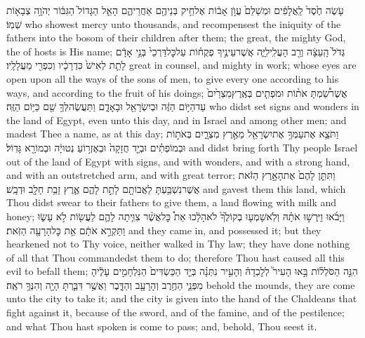 {עֹ֤שֶׂה חֶ֙סֶד֙ לַֽאֲלָפִ֔ים וּמְשַׁלֵּם֙ עֲוֺ֣ן אָב֔וֹת אֶל\maqqaf חֵ֥יק בְּנֵיהֶ֖ם אַחֲרֵיהֶ֑ם הָאֵ֤ל הַגָּדוֹל֙ הַגִּבּ֔וֹר יְהֹוָ֥ה צְבָא֖וֹת שְׁמֽוֹ׃}
{who showest mercy unto thousands, and recompensest the iniquity of the fathers into the bosom of their children after them; the great, the mighty God, the \lord\space of hosts is His name;}
{גְּדֹל֙ הָֽעֵצָ֔ה וְרַ֖ב הָעֲלִֽילִיָּ֑ה אֲשֶׁר\maqqaf עֵינֶ֣יךָ פְקֻח֗וֹת עַל\maqqaf כׇּל\maqqaf דַּרְכֵי֙ בְּנֵ֣י אָדָ֔ם לָתֵ֤ת לְאִישׁ֙ כִּדְרָכָ֔יו וְכִפְרִ֖י מַעֲלָלָֽיו׃}
{great in counsel, and mighty in work; whose eyes are open upon all the ways of the sons of men, to give every one according to his ways, and according to the fruit of his doings;}
{אֲשֶׁר\maqqaf שַׂ֠מְתָּ אֹת֨וֹת וּמֹפְתִ֤ים בְּאֶֽרֶץ\maqqaf מִצְרַ֙יִם֙ עַד\maqqaf הַיּ֣וֹם הַזֶּ֔ה וּבְיִשְׂרָאֵ֖ל וּבָאָדָ֑ם וַתַּעֲשֶׂה\maqqaf לְּךָ֥ שֵׁ֖ם כַּיּ֥וֹם הַזֶּֽה׃}
{who didst set signs and wonders in the land of Egypt, even unto this day, and in Israel and among other men; and madest Thee a name, as at this day;}
{וַתֹּצֵ֛א אֶת\maqqaf עַמְּךָ֥ אֶת\maqqaf יִשְׂרָאֵ֖ל מֵאֶ֣רֶץ מִצְרָ֑יִם בְּאֹת֣וֹת וּבְמוֹפְתִ֗ים וּבְיָ֤ד חֲזָקָה֙ וּבְאֶזְר֣וֹעַ נְטוּיָ֔ה וּבְמוֹרָ֖א גָּדֽוֹל׃}
{and didst bring forth Thy people Israel out of the land of Egypt with signs, and with wonders, and with a strong hand, and with an outstretched arm, and with great terror;}
{וַתִּתֵּ֤ן לָהֶם֙ אֶת\maqqaf הָאָ֣רֶץ הַזֹּ֔את אֲשֶׁר\maqqaf נִשְׁבַּ֥עְתָּ לַאֲבוֹתָ֖ם לָתֵ֣ת לָהֶ֑ם אֶ֛רֶץ זָבַ֥ת חָלָ֖ב וּדְבָֽשׁ׃}
{and gavest them this land, which Thou didst swear to their fathers to give them, a land flowing with milk and honey;}
{וַיָּבֹ֜אוּ וַיִּֽרְשׁ֣וּ אֹתָ֗הּ וְלֹֽא\maqqaf שָׁמְע֤וּ בְקוֹלֶ֙ךָ֙  לֹא\maqqaf הָלָ֔כוּ אֵת֩ כׇּל\maqqaf אֲשֶׁ֨ר צִוִּ֧יתָה לָהֶ֛ם לַעֲשׂ֖וֹת לֹ֣א עָשׂ֑וּ וַתַּקְרֵ֣א אֹתָ֔ם אֵ֥ת כׇּל\maqqaf הָרָעָ֖ה הַזֹּֽאת׃}
{and they came in, and possessed it; but they hearkened not to Thy voice, neither walked in Thy law; they have done nothing of all that Thou commandedst them to do; therefore Thou hast caused all this evil to befall them;}
{הִנֵּ֣ה הַסֹּלְל֗וֹת בָּ֣אוּ הָעִיר֮ לְלׇכְדָהּ֒ וְהָעִ֣יר נִתְּנָ֗ה בְּיַ֤ד הַכַּשְׂדִּים֙ הַנִּלְחָמִ֣ים עָלֶ֔יהָ מִפְּנֵ֛י הַחֶ֥רֶב וְהָרָעָ֖ב וְהַדָּ֑בֶר וַאֲשֶׁ֥ר דִּבַּ֛רְתָּ הָיָ֖ה וְהִנְּךָ֥ רֹאֶֽה׃}
{behold the mounds, they are come unto the city to take it; and the city is given into the hand of the Chaldeans that fight against it, because of the sword, and of the famine, and of the pestilence; and what Thou hast spoken is come to pass; and, behold, Thou seest it.}
